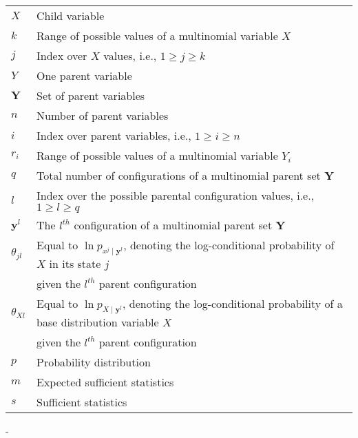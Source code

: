 \documentclass[11pt, oneside]{article}   	%
\numberwithin{figure}{section}
\numberwithin{equation}{section}
\numberwithin{table}{section}
\theoremstyle{definition}
\begin{document}
\begin{appendices}
\begin{table}[ht!]
\renewcommand{\arraystretch}{1.1}
{\small
\begin{tabular}{l l}
$X$ & Child variable\\
$k$& Range of possible values of a multinomial variable $X$\\
$j$ & Index over $X$ values, i.e., $1 \geq j \geq k$ \\
$Y$ & One parent variable\\
$\mathbf{Y}$ & Set of parent variables\\
$n$& Number of parent variables \\
$i$ & Index over parent variables, i.e., $1 \geq i \geq n$ \\
$r_i$& Range of possible values of a multinomial variable $Y_i$\\
$q $ & Total number of configurations of a multinomial parent set $\mathbf{Y}$\\
$l$ & Index over the possible parental configuration values, i.e., $1 \geq l \geq q$ \\
$\mathbf{y}^l$ & The $l^{th}$ configuration of a multinomial parent set $\mathbf{Y}$\\
$\theta_{jl}$ & Equal to $\ln p_{x^j\mid \mathbf{y}^l}$, denoting the log-conditional probability of $X$ in its state $j$ \\
                    & given the $l^{th}$ parent configuration\\
$\theta_{Xl}$ & Equal to $\ln p_{ X \mid \mathbf{y}^l}$, denoting the log-conditional probability of a base distribution variable $X$ \\
                    & given the $l^{th}$ parent configuration\\
$p$ & Probability distribution\\
$m$ & Expected sufficient statistics \\
$s$ & Sufficient statistics \\
\end{tabular}}
\end{table}
-

\end{appendices}



\end{document}
